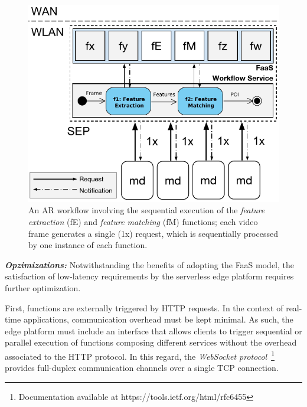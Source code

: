 
\begin{figure}[tbp]
	\centering
	\includegraphics[width=\linewidth]{Figs/Mobile_Computation_Offloading_Workflow.pdf}
	\caption{An AR workflow involving the sequential execution of the \textit{feature extraction} (fE) and \textit{feature matching} (fM) functions; each video frame generates a single (1x) request, which is sequentially processed by one instance of each function.} 
	\label{fig:Mobile_Computation_Offloading_Workflow}
\end{figure}

\textbf{\textit{Opzimizations:}} Notwithstanding the benefits of adopting the FaaS model,
the satisfaction of low-latency requirements by the serverless edge platform requires further optimization.

First, functions are externally triggered by HTTP requests. In the context of real-time applications, communication overhead must be kept minimal. As such, the edge platform must include an interface that allows clients to trigger sequential or parallel execution of functions composing different services without the overhead associated to the HTTP protocol. In this regard, the \textit{WebSocket protocol}~\footnote{Documentation available at https://tools.ietf.org/html/rfc6455}
provides full-duplex communication channels over a single TCP connection. %


